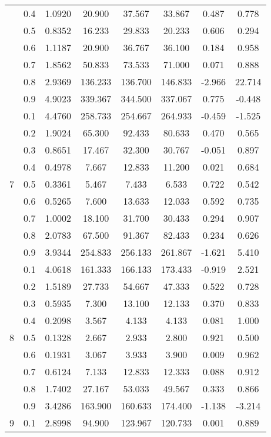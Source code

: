\documentclass[11pt,a4paper]{report}
\begin{document}
\begin{longtable}{ | c | c || c | c | c | c | c | c | }
 & 0.4 & 1.0920 & 20.900 & 37.567 & 33.867 & 0.487 & 0.778 \\
 & 0.5 & 0.8352 & 16.233 & 29.833 & 20.233 & 0.606 & 0.294 \\
 & 0.6 & 1.1187 & 20.900 & 36.767 & 36.100 & 0.184 & 0.958 \\
 & 0.7 & 1.8562 & 50.833 & 73.533 & 71.000 & 0.071 & 0.888 \\
 & 0.8 & 2.9369 & 136.233 & 136.700 & 146.833 & -2.966 & 22.714 \\
 & 0.9 & 4.9023 & 339.367 & 344.500 & 337.067 & 0.775 & -0.448 \\
 \hline
\multirow{9}{*}{7} & 0.1 & 4.4760 & 258.733 & 254.667 & 264.933 & -0.459 & -1.525 \\
 & 0.2 & 1.9024 & 65.300 & 92.433 & 80.633 & 0.470 & 0.565 \\
 & 0.3 & 0.8651 & 17.467 & 32.300 & 30.767 & -0.051 & 0.897 \\
 & 0.4 & 0.4978 & 7.667 & 12.833 & 11.200 & 0.021 & 0.684 \\
 & 0.5 & 0.3361 & 5.467 & 7.433 & 6.533 & 0.722 & 0.542 \\
 & 0.6 & 0.5265 & 7.600 & 13.633 & 12.033 & 0.592 & 0.735 \\
 & 0.7 & 1.0002 & 18.100 & 31.700 & 30.433 & 0.294 & 0.907 \\
 & 0.8 & 2.0783 & 67.500 & 91.367 & 82.433 & 0.234 & 0.626 \\
 & 0.9 & 3.9344 & 254.833 & 256.133 & 261.867 & -1.621 & 5.410 \\
 \hline
\multirow{9}{*}{8} & 0.1 & 4.0618 & 161.333 & 166.133 & 173.433 & -0.919 & 2.521 \\
 & 0.2 & 1.5189 & 27.733 & 54.667 & 47.333 & 0.522 & 0.728 \\
 & 0.3 & 0.5935 & 7.300 & 13.100 & 12.133 & 0.370 & 0.833 \\
 & 0.4 & 0.2098 & 3.567 & 4.133 & 4.133 & 0.081 & 1.000 \\
 & 0.5 & 0.1328 & 2.667 & 2.933 & 2.800 & 0.921 & 0.500 \\
 & 0.6 & 0.1931 & 3.067 & 3.933 & 3.900 & 0.009 & 0.962 \\
 & 0.7 & 0.6124 & 7.133 & 12.833 & 12.333 & 0.088 & 0.912 \\
 & 0.8 & 1.7402 & 27.167 & 53.033 & 49.567 & 0.333 & 0.866 \\
 & 0.9 & 3.4286 & 163.900 & 160.633 & 174.400 & -1.138 & -3.214 \\
 \hline
\multirow{9}{*}{9} & 0.1 & 2.8998 & 94.900 & 123.967 & 120.733 & 0.001 & 0.889 \\

\end{longtable}
\end{document}
